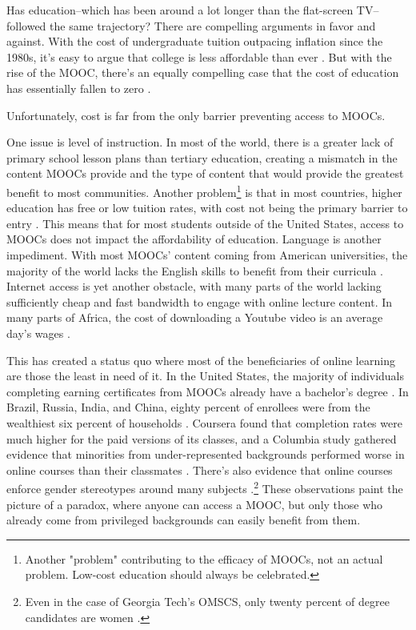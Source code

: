 \documentclass[
	letterpaper, %
]{jdf}
\begin{document}
Has education–which has been around a lot longer than the flat-screen TV–followed the same trajectory? There are compelling arguments in favor and against. With the cost of undergraduate tuition outpacing inflation since the 1980s, it's easy to argue that college is less affordable than ever . But with the rise of the MOOC, there's an equally compelling case that the cost of education has essentially fallen to zero .

Unfortunately, cost is far from the only barrier preventing access to MOOCs.

One issue is level of instruction. In most of the world, there is a greater lack of primary school lesson plans than tertiary education, creating a mismatch in the content MOOCs provide and the type of content that would provide the greatest benefit to most communities. Another problem\footnote{Another "problem" contributing to the efficacy of MOOCs, not an actual problem. Low-cost education should always be celebrated.} is that in most countries, higher education has free or low tuition rates, with cost not being the primary barrier to entry . This means that for most students outside of the United States, access to MOOCs does not impact the affordability of education. Language is another impediment. With most MOOCs' content coming from American universities, the majority of the world lacks the English skills to benefit from their curricula . Internet access is yet another obstacle, with  many parts of the world lacking sufficiently cheap and fast bandwidth to engage with online lecture content. In many parts of Africa, the cost of downloading a Youtube video is an average day's wages .

This has created a status quo where most of the beneficiaries of online learning are those the least in need of it. In the United States, the majority of individuals completing earning certificates from MOOCs already have a bachelor's degree . In Brazil, Russia, India, and China, eighty percent of enrollees were from the wealthiest six percent of households \cite{adams2013moocs}. Coursera found that completion rates were much higher for the paid versions of its classes, and a Columbia study gathered evidence that minorities from under-represented backgrounds performed worse in online courses than their classmates . There's also evidence that online courses enforce gender stereotypes around many subjects .\footnote{Even in the case of Georgia Tech's OMSCS, only twenty percent of degree candidates are women .} These observations paint the picture of a paradox, where anyone can access a MOOC, but only those who already come from privileged backgrounds can easily benefit from them.
\end{document}
